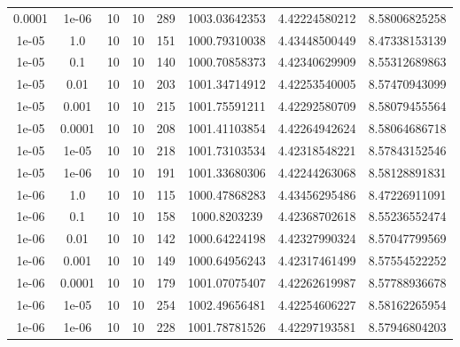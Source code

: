 \documentclass[11pt,a4paper]{article}
\begin{document}
\begin{table}
{\begin{tabular}{*{8}c}
 0.0001 & 1e-06 &10 &10 & 289& 1003.03642353 & 4.42224580212 & 8.58006825258 \\
 1e-05 & 1.0 &10 &10 & 151& 1000.79310038 & 4.43448500449 & 8.47338153139 \\
 1e-05 & 0.1 &10 &10 & 140& 1000.70858373 & 4.42340629909 & 8.55312689863 \\
 1e-05 & 0.01 &10 &10 & 203& 1001.34714912 & 4.42253540005 & 8.57470943099 \\
 1e-05 & 0.001 &10 &10 & 215& 1001.75591211 & 4.42292580709 & 8.58079455564 \\
 1e-05 & 0.0001 &10 &10 & 208& 1001.41103854 & 4.42264942624 & 8.58064686718 \\
 1e-05 & 1e-05 &10 &10 & 218& 1001.73103534 & 4.42318548221 & 8.57843152546 \\
 1e-05 & 1e-06 &10 &10 & 191& 1001.33680306 & 4.42244263068 & 8.58128891831 \\
 1e-06 & 1.0 &10 &10 & 115& 1000.47868283 & 4.43456295486 & 8.47226911091 \\
 1e-06 & 0.1 &10 &10 & 158& 1000.8203239 & 4.42368702618 & 8.55236552474 \\
 1e-06 & 0.01 &10 &10 & 142& 1000.64224198 & 4.42327990324 & 8.57047799569 \\
 1e-06 & 0.001 &10 &10 & 149& 1000.64956243 & 4.42317461499 & 8.57554522252 \\
 1e-06 & 0.0001 &10 &10 & 179& 1001.07075407 & 4.42262619987 & 8.57788936678 \\
 1e-06 & 1e-05 &10 &10 & 254& 1002.49656481 & 4.42254606227 & 8.58162265954 \\
 1e-06 & 1e-06 &10 &10 & 228& 1001.78781526 & 4.42297193581 & 8.57946804203 \\
\end{tabular}}
\label{Tab::1}
\end{table} 
\end{document}
